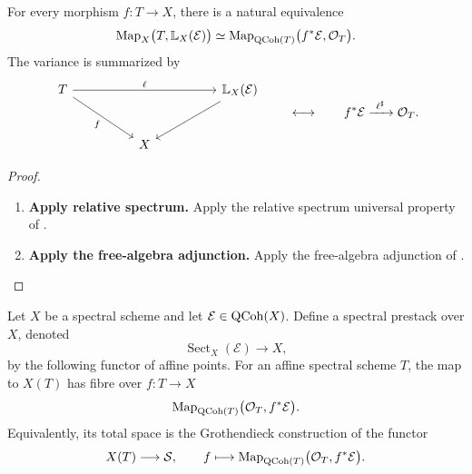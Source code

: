 \begin{proposition}
\label{prop:linear-space-functor-points}
For every morphism $f:T\to X$, there is a natural equivalence
\[
    \operatorname{Map}_X
    \bigl(
        T,
        \mathbb L_X(\mathcal E)
    \bigr)
    \simeq
    \operatorname{Map}_{\operatorname{QCoh}(T)}
    \bigl(
        f^*\mathcal E,
        \mathcal O_T
    \bigr).
\]
The variance is summarized by
\[
\begin{tikzcd}[column sep=huge, row sep=large]
    T
        \arrow[rr, "\ell"]
        \arrow[dr, "f"']
    &&
    \mathbb L_X(\mathcal E)
        \arrow[dl]
    \\
    & X &
\end{tikzcd}
\qquad\longleftrightarrow\qquad
f^*\mathcal E\xrightarrow{\ \ell^\sharp\ }\mathcal O_T.
\]
\end{proposition}

\begin{proof}
\leavevmode
\begin{enumerate}[label=\textup{(\arabic*)}]
    \item \textbf{Apply relative spectrum.}
    Apply the relative spectrum universal property of
    .

    \item \textbf{Apply the free-algebra adjunction.}
    Apply the free-algebra adjunction of
    .
\end{enumerate}
\end{proof}

\begin{construction}
\label{con:section-stack-qcoh}
Let \(X\) be a spectral scheme and let \(\mathcal E\in\operatorname{QCoh}(X)\). Define a
spectral prestack over \(X\), denoted
\[
    \operatorname{Sect}_X(\mathcal E)
    \longrightarrow
    X,
\]
by the following functor of affine points. For an affine spectral scheme
\(T\), the map to \(X(T)\) has fibre over \(f:T\to X\)
\[
    \operatorname{Map}_{\operatorname{QCoh}(T)}
    \bigl(\mathcal O_T,f^*\mathcal E\bigr).
\]
Equivalently, its total space is the Grothendieck construction of the functor
\[
    X(T)
    \longrightarrow
    \mathcal S,
    \qquad
    f\longmapsto
    \operatorname{Map}_{\operatorname{QCoh}(T)}
    \bigl(\mathcal O_T,f^*\mathcal E\bigr).
\]
\end{construction}

